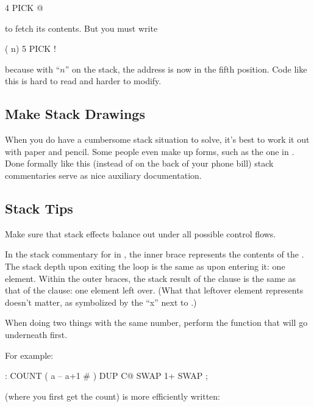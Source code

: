 \begin{Code}
4 PICK @
\end{Code}
to fetch its contents. But you must write

\begin{Code}
( n) 5 PICK !
\end{Code}
because with ``$n$'' on the stack, the address is now in the fifth position.
Code like this is hard to read and harder to modify.%

\subsection{Make Stack Drawings}%

When you do have a cumbersome stack situation to solve, it's best to work
it out with paper and pencil. Some people even make up forms, such as the
one in . Done formally like this (instead of on the back of your
phone bill) stack commentaries serve as nice auxiliary documentation.

\subsection{Stack Tips}

\begin{tip}
Make sure that stack effects balance out under all possible control flows.
\end{tip}
In the stack commentary for  in , the inner brace
represents the contents of the  . The stack depth upon exiting
the loop is the same as upon entering it: one element. Within the outer
braces, the stack result of the  clause is the same as that of the
 clause: one element left over. (What that leftover element
represents doesn't matter, as symbolized by the ``x'' next to .)



\begin{tip}
When doing two things with the same number, perform the function that
will go underneath first.
\end{tip}
For example:

\begin{Code}
: COUNT  ( a -- a+1 # )  DUP C@  SWAP 1+  SWAP ;
\end{Code}
(where you first get the count) is more efficiently written:

